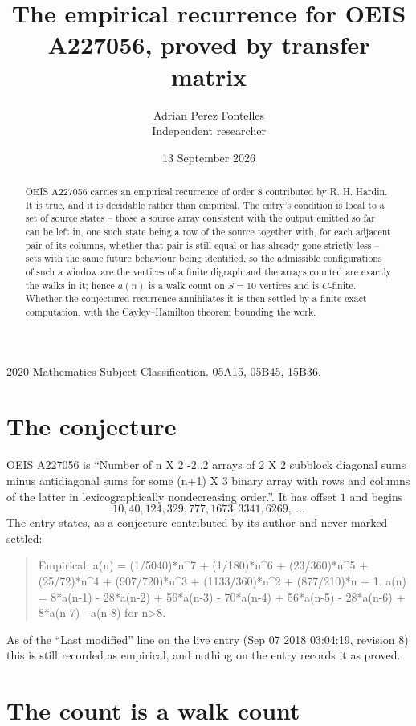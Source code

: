 \documentclass[11pt,a4paper]{article}
\title{The empirical recurrence for OEIS A227056, proved by transfer matrix}
\author{Adrian Perez Fontelles\\ \small Independent researcher}
\date{13 September 2026}
\theoremstyle{plain}
\theoremstyle{definition}
\begin{document}
\maketitle

\begin{abstract}
OEIS A227056 carries an empirical recurrence of order $8$ contributed by R. H. Hardin. It is
true, and it is decidable rather than empirical. The entry's condition is local to a set of source states -- those a source array consistent with the output emitted so far can be left in, one such state being a row of the source together with, for each adjacent pair of its columns, whether that pair is still equal or has already gone strictly less -- sets with the same future behaviour being identified, so
the admissible configurations of such a window are the vertices of a finite digraph and the
arrays counted are exactly the walks in it; hence $a(n)$ is a walk count on $S=10$ vertices
and is $C$-finite. Whether the conjectured recurrence annihilates it is then settled by a
finite exact computation, with the Cayley--Hamilton theorem bounding the work.
\end{abstract}

\noindent\small 2020 Mathematics Subject Classification. 05A15, 05B45, 15B36.\normalsize

\section{The conjecture}

OEIS A227056 is ``Number of n X 2 -2..2 arrays of 2 X 2 subblock diagonal sums minus antidiagonal sums for some (n+1) X 3 binary array with rows and columns of the latter in lexicographically nondecreasing order.''. It has offset $1$ and begins
\[
10, 40, 124, 329, 777, 1673, 3341, 6269,\ \dots
\]
The entry states, as a conjecture contributed by its author and never marked settled:
\begin{quote}
Empirical: a(n) = (1/5040)*n\^{}7 + (1/180)*n\^{}6 + (23/360)*n\^{}5 + (25/72)*n\^{}4 + (907/720)*n\^{}3 + (1133/360)*n\^{}2 + (877/210)*n + 1. a(n) = 8*a(n-1) - 28*a(n-2) + 56*a(n-3) - 70*a(n-4) + 56*a(n-5) - 28*a(n-6) + 8*a(n-7) - a(n-8) for n>8.
\end{quote}
As of the ``Last modified'' line on the live entry (Sep 07 2018 03:04:19, revision 8) this is still
recorded as empirical, and nothing on the entry records it as proved.

\section{The count is a walk count}
\end{document}
